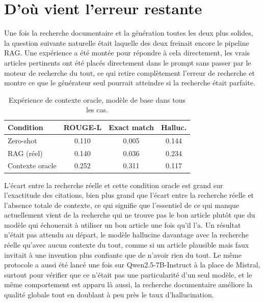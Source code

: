 \documentclass[11pt, a4paper]{article}
\begin{document}
\section{D'o\`u vient l'erreur restante}

Une fois la recherche documentaire et la g\'en\'eration toutes les deux plus solides, la question suivante naturelle \'etait laquelle des deux freinait encore le pipeline RAG. Une exp\'erience a \'et\'e mont\'ee pour r\'epondre \`a cela directement, les vrais articles pertinents ont \'et\'e plac\'es directement dans le prompt sans passer par le moteur de recherche du tout, ce qui retire compl\`etement l'erreur de recherche et montre ce que le g\'en\'erateur seul pourrait atteindre si la recherche \'etait parfaite.

\begin{table}[H]
\centering
\small
\begin{tabular}{lccc}
\toprule
\textbf{Condition} & \textbf{ROUGE-L} & \textbf{Exact match} & \textbf{Halluc.} \\
\midrule
Zero-shot & 0.110 & 0.005 & 0.144 \\
RAG (r\'eel) & 0.140 & 0.036 & 0.234 \\
Contexte oracle & 0.252 & 0.311 & 0.117 \\
\bottomrule
\end{tabular}
\caption{Exp\'erience de contexte oracle, mod\`ele de base dans tous les cas.}
\label{tab:oracle}
\end{table}

L'\'ecart entre la recherche r\'eelle et cette condition oracle est grand sur l'exactitude des citations, bien plus grand que l'\'ecart entre la recherche r\'eelle et l'absence totale de contexte, ce qui signifie que l'essentiel de ce qui manque actuellement vient de la recherche qui ne trouve pas le bon article plut\^ot que du mod\`ele qui \'echouerait \`a utiliser un bon article une fois qu'il l'a. Un r\'esultat n'\'etait pas attendu au d\'epart, le mod\`ele hallucine davantage avec la recherche r\'eelle qu'avec aucun contexte du tout, comme si un article plausible mais faux invitait \`a une invention plus confiante que de n'avoir rien du tout. Le m\^eme protocole a aussi \'et\'e lanc\'e une fois sur Qwen2.5-7B-Instruct \`a la place de Mistral, surtout pour v\'erifier que ce n'\'etait pas une particularit\'e d'un seul mod\`ele, et le m\^eme comportement est apparu l\`a aussi, la recherche documentaire am\'eliore la qualit\'e globale tout en doublant \`a peu pr\`es le taux d'hallucination.
\end{document}
